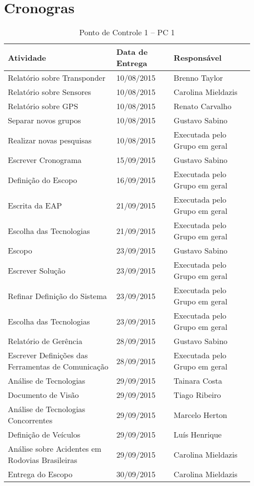 \chapter{Cronogras}


\begin{table}[]
\centering
\caption{Ponto de Controle 1 – PC  1}
\label{custo_equip}
\begin{tabular}{|p{5cm}|p{3cm}|p{5cm}|}
  \hline
  \textbf{Atividade} & \textbf{Data de Entrega} & \textbf{Responsável}\\
  \hline
  Relatório sobre Transponder & 10/08/2015 & Brenno Taylor\\
  \hline
  Relatório sobre Sensores & 10/08/2015 & Carolina Mieldazis\\
  \hline
  Relatório sobre GPS & 10/08/2015 &Renato Carvalho \\
  \hline
  Separar novos grupos & 10/08/2015 & Gustavo Sabino\\
  \hline
  Realizar novas pesquisas & 10/08/2015 & Executada pelo Grupo em geral\\
  \hline
  Escrever Cronograma & 15/09/2015 & Gustavo Sabino\\
  \hline
  Definição do Escopo & 16/09/2015 & Executada pelo Grupo em geral\\
  \hline
  Escrita da EAP & 21/09/2015 & Executada pelo Grupo em geral\\
  \hline
  Escolha das Tecnologias & 21/09/2015 & Executada pelo Grupo em geral\\
  \hline
  Escopo & 23/09/2015 &Gustavo Sabino \\
  \hline
  Escrever Solução & 23/09/2015 &Executada pelo Grupo em geral \\
  \hline
  Refinar Definição do Sistema & 23/09/2015 & Executada pelo Grupo em geral\\
  \hline
  Escolha das Tecnologias & 23/09/2015 & Executada pelo Grupo em geral\\
  \hline
  Relatório de Gerência & 28/09/2015 &Gustavo Sabino \\
  \hline
  Escrever Definições das Ferramentas de Comunicação & 28/09/2015 & Executada pelo Grupo em geral\\
  \hline
  Análise de Tecnologias & 29/09/2015 & Tainara Costa\\
  \hline
  Documento de Visão & 29/09/2015 & Tiago Ribeiro\\
  \hline
  Análise de Tecnologias Concorrentes & 29/09/2015 & Marcelo Herton\\

  \hline
  Definição de Veículos & 29/09/2015 &Luís Henrique \\
  \hline
  Análise sobre Acidentes em Rodovias Brasileiras & 29/09/2015 &Carolina Mieldazis \\
  \hline
  Entrega do Escopo & 30/09/2015 & Carolina Mieldazis\\
  \hline

\end{tabular}
\end{table}

